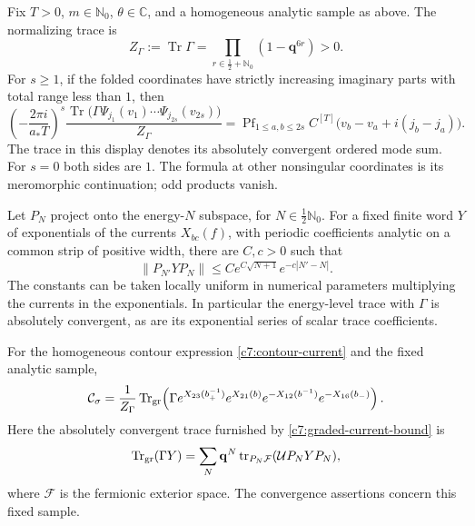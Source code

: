 \begin{lemma}\label{c7:angular-trace}
Fix $T>0$, $m\in\mathbb N_0$, $\theta\in\mathbb C$, and a homogeneous analytic sample as above. The normalizing trace is
\[
Z_\Gamma:=\operatorname{Tr}\Gamma
=\prod_{r\in\frac12+\mathbb N_0}(1-\mathbf q^{6r})>0.
\]
For $s\ge1$, if the folded coordinates have strictly increasing imaginary parts with total range less than $1$, then
\begin{equation}\label{c7:angular-wick}
\left(-\frac{2\pi i}{a_*T}\right)^s
\frac{\operatorname{Tr}\bigl(\Gamma\Psi_{j_1}(v_1)\cdots
 \Psi_{j_{2s}}(v_{2s})\bigr)}{Z_\Gamma}
=
\operatorname{Pf}_{1\le a,b\le2s}
 C^{[T]}\bigl(v_b-v_a+i(j_b-j_a)\bigr).
\end{equation}
The trace in this display denotes its absolutely convergent ordered mode sum. For $s=0$ both sides are $1$. The formula at other nonsingular coordinates is its meromorphic continuation; odd products vanish.

Let $P_N$ project onto the energy-$N$ subspace, for $N\in\frac12\mathbb N_0$. For a fixed finite word $Y$ of exponentials of the currents $X_{bc}(f)$, with periodic coefficients analytic on a common strip of positive width, there are $C,c>0$ such that
\begin{equation}\label{c7:graded-current-bound}
\|P_{N'}YP_N\|\le C e^{C\sqrt{N+1}}e^{-c|N'-N|}.
\end{equation}
The constants can be taken locally uniform in numerical parameters multiplying the currents in the exponentials. In particular the energy-level trace with $\Gamma$ is absolutely convergent, as are its exponential series of scalar trace coefficients.

For the homogeneous contour expression \eqref{c7:contour-current} and the fixed analytic sample,
\begin{equation}\label{c7:four-current-trace}
\mathcal C_\sigma
=\frac1{Z_\Gamma}\operatorname{Tr}_{\rm gr}\!\left(
 \Gamma e^{X_{23}(b_+^{-1})}e^{X_{21}(b)}
 e^{-X_{12}(b^{-1})}e^{-X_{16}(b_-)}\right).
\end{equation}
Here the absolutely convergent trace furnished by \eqref{c7:graded-current-bound} is
\[
\operatorname{Tr}_{\rm gr}(\Gamma Y)
=\sum_N\mathbf q^N
 \operatorname{tr}_{P_N\mathcal F}(\mathcal U P_NYP_N),
\]
where $\mathcal F$ is the fermionic exterior space. The convergence assertions concern this fixed sample.
\end{lemma}

